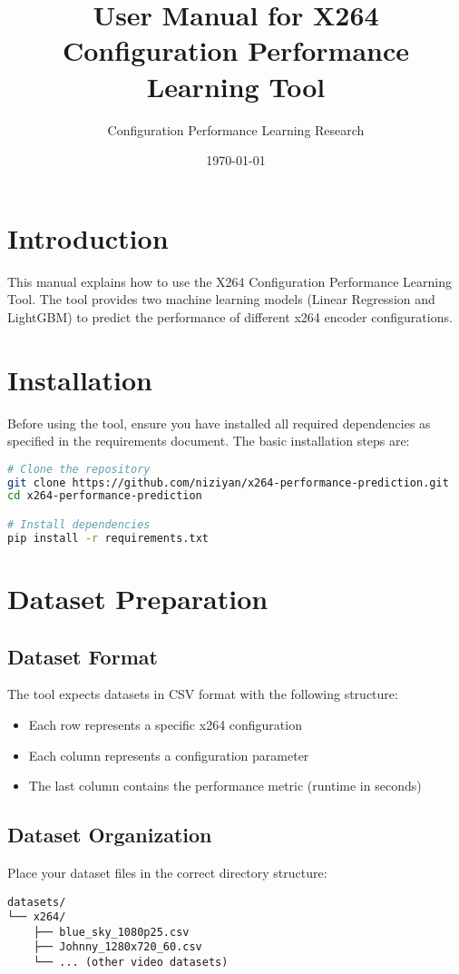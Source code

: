 \documentclass[10pt]{article}
\title{User Manual for X264 Configuration Performance Learning Tool}
\author{Configuration Performance Learning Research}
\date{\today}
\begin{document}
\maketitle

\section{Introduction}

This manual explains how to use the X264 Configuration Performance Learning Tool. The tool provides two machine learning models (Linear Regression and LightGBM) to predict the performance of different x264 encoder configurations.

\section{Installation}

Before using the tool, ensure you have installed all required dependencies as specified in the requirements document. The basic installation steps are:

\begin{lstlisting}[language=bash]
# Clone the repository
git clone https://github.com/niziyan/x264-performance-prediction.git
cd x264-performance-prediction

# Install dependencies
pip install -r requirements.txt
\end{lstlisting}

\section{Dataset Preparation}

\subsection{Dataset Format}
The tool expects datasets in CSV format with the following structure:
\begin{itemize}
    \item Each row represents a specific x264 configuration
    \item Each column represents a configuration parameter
    \item The last column contains the performance metric (runtime in seconds)
\end{itemize}

\subsection{Dataset Organization}
Place your dataset files in the correct directory structure:
\begin{lstlisting}
datasets/
└── x264/
    ├── blue_sky_1080p25.csv
    ├── Johnny_1280x720_60.csv
    └── ... (other video datasets)
\end{lstlisting}
\end{document}
